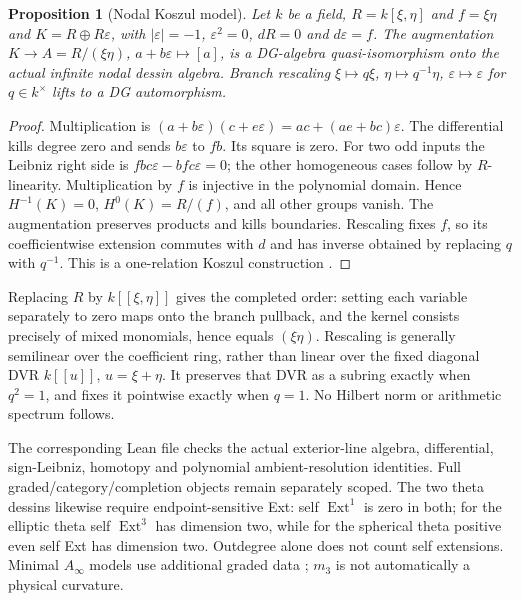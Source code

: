 \documentclass[11pt]{article}
\newtheorem{proposition}[theorem]{Proposition}
\theoremstyle{definition}\newtheorem{definition}[theorem]{Definition}
\theoremstyle{remark}\newtheorem{remark}[theorem]{Remark}
\begin{document}
\begin{proposition}[Nodal Koszul model]\label{thm:nodal-dg}
Let $k$ be a field, $R=k[\xi,\eta]$ and $f=\xi\eta$ and $K=R\oplus R\varepsilon$, with
$|\varepsilon|=-1$, $\varepsilon^2=0$, $dR=0$ and $d\varepsilon=f$.
The augmentation $K\to A=R/(\xi\eta)$, $a+b\varepsilon\mapsto[a]$,
is a DG-algebra quasi-isomorphism onto the actual infinite nodal dessin
algebra. Branch rescaling $\xi\mapsto q\xi$, $\eta\mapsto q^{-1}\eta$,
$\varepsilon\mapsto\varepsilon$ for $q\in k^\times$ lifts to a DG automorphism.
\end{proposition}
\begin{proof}
Multiplication is $(a+b\varepsilon)(c+e\varepsilon)=ac+(ae+bc)\varepsilon$.
The differential kills degree zero and sends $b\varepsilon$ to $fb$.
Its square is zero. For two odd inputs the Leibniz right side is
$fbc\varepsilon-bfc\varepsilon=0$; the other homogeneous cases follow
by $R$-linearity. Multiplication by $f$ is injective in the polynomial
domain. Hence $H^{-1}(K)=0$, $H^0(K)=R/(f)$, and all other groups vanish.
The augmentation preserves products and kills boundaries. Rescaling fixes
$f$, so its coefficientwise extension commutes with $d$ and has inverse
obtained by replacing $q$ with $q^{-1}$. This is a one-relation Koszul
construction \cite{StacksKoszulDG,StacksKoszulRegular}.
\end{proof}
Replacing $R$ by $k[[\xi,\eta]]$ gives the completed order: setting each
variable separately to zero maps onto the branch pullback, and the kernel
consists precisely of mixed monomials, hence equals $(\xi\eta)$.
Rescaling is generally semilinear over the coefficient ring, rather than
linear over the fixed diagonal DVR $k[[u]]$, $u=\xi+\eta$.
It preserves that DVR as a subring exactly when $q^2=1$, and fixes it
pointwise exactly when $q=1$. No Hilbert norm or arithmetic spectrum follows.

The corresponding Lean file checks the actual exterior-line algebra,
differential, sign-Leibniz, homotopy and polynomial ambient-resolution
identities. Full graded/category/completion objects remain separately scoped.
The two theta dessins likewise require endpoint-sensitive Ext: self
$\operatorname{Ext}^1$ is zero in both; for the elliptic theta self
$\operatorname{Ext}^3$ has dimension two, while for the spherical theta
positive even self Ext has dimension two. Outdegree alone does not count
self extensions. Minimal $A_\infty$ models use additional graded data
\cite[\S3.3]{KellerAinf}; $m_3$ is not automatically a physical curvature.
\end{document}
